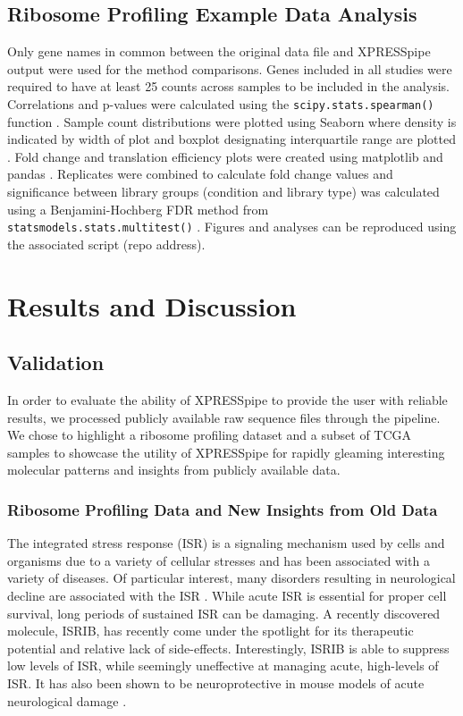 \documentclass[11pt, a4paper, oneside]{article}
\begin{document}
\subsection{Ribosome Profiling Example Data Analysis}
Only gene names in common between the original data file and XPRESSpipe output were used for the method comparisons. Genes included in all studies were required to have at least 25 counts across samples to be included in the analysis. Correlations and p-values were calculated using the \texttt{scipy.stats.spearman()} function \cite{spearman_rnaseq}. Sample count distributions were plotted using Seaborn where density is indicated by width of plot and boxplot designating interquartile range are plotted \cite{seaborn}. Fold change and translation efficiency plots were created using matplotlib \cite{matplotlib} and pandas \cite{pandas}. Replicates were combined to calculate fold change values and significance between library groups (condition and library type) was calculated using a Benjamini-Hochberg FDR method from \texttt{statsmodels.stats.multitest()} \cite{statsmodels}. Figures and analyses can be reproduced using the associated script (repo address).

\section{Results and Discussion}

\subsection{Validation}
In order to evaluate the ability of XPRESSpipe to provide the user with reliable results, we processed publicly available raw sequence files through the pipeline. We chose to highlight a ribosome profiling dataset and a subset of TCGA samples to showcase the utility of XPRESSpipe for rapidly gleaming interesting molecular patterns and insights from publicly available data.

\subsubsection{Ribosome Profiling Data and New Insights from Old Data}
The integrated stress response (ISR) is a signaling mechanism used by cells and organisms due to a variety of cellular stresses and has been associated with a variety of diseases. Of particular interest, many disorders resulting in neurological decline are associated with the ISR \cite{isr_disease}. While acute ISR is essential for proper cell survival, long periods of sustained ISR can be damaging. A recently discovered molecule, ISRIB, has recently come under the spotlight for its therapeutic potential and relative lack of side-effects. Interestingly, ISRIB is able to suppress low levels of ISR, while seemingly uneffective at managing acute, high-levels of ISR. It has also been shown to be neuroprotective in mouse models of acute neurological damage \cite{isrib_activation, isrib_structure, isrib_riboseq, isrib_neuroprotective}.
\end{document}
